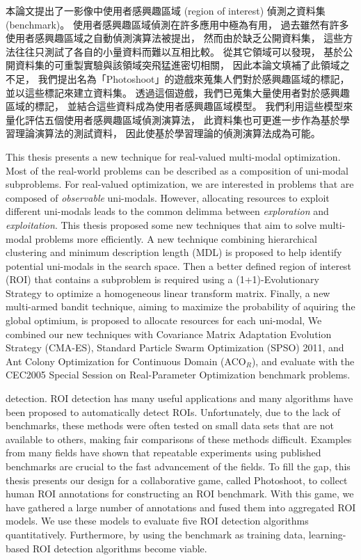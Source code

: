 \begin{abstractzh}
本論文提出了一影像中使用者感興趣區域 (region of interest)
偵測之資料集 (benchmark)。
使用者感興趣區域偵測在許多應用中極為有用，
過去雖然有許多使用者感興趣區域之自動偵測演算法被提出，
然而由於缺乏公開資料集，
這些方法往往只測試了各自的小量資料而難以互相比較。
從其它領域可以發現，
基於公開資料集的可重製實驗與該領域突飛猛進密切相關，
因此本論文填補了此領域之不足，
我們提出名為「Photoshoot」的遊戲來蒐集人們對於感興趣區域的標記，
並以這些標記來建立資料集。
透過這個遊戲，我們已蒐集大量使用者對於感興趣區域的標記，
並結合這些資料成為使用者感興趣區域模型。
我們利用這些模型來量化評估五個使用者感興趣區域偵測演算法，
此資料集也可更進一步作為基於學習理論演算法的測試資料，
因此使基於學習理論的偵測演算法成為可能。
\end{abstractzh}

\begin{abstracten}
This thesis presents a new technique for real-valued multi-modal optimization.
Most of the real-world problems can be described as a composition of uni-modal subproblems.
For real-valued optimization, we are interested in problems that are composed of \textit{observable} uni-modals.
However, allocating resources to exploit different uni-modals leads to the 
common delimma between \textit{exploration} and \textit{exploitation}.
This thesis proposed some new techniques that aim to solve multi-modal problems more efficiently.
A new technique combining hierarchical clustering and minimum description length (MDL) 
is proposed to help identify potential uni-modals in the search space.
Then a better defined region of interest (ROI) that contains a subproblem is required 
using a (1+1)-Evolutionary Strategy to optimize a homogeneous linear transform matrix.
Finally, a new multi-armed bandit technique, aiming to maximize the probability of aquiring the global optimium,
is proposed to allocate resources for each uni-modal,
We combined our new techniques with Covariance Matrix Adaptation Evolution Strategy (CMA-ES), 
Standard Particle Swarm Optimization (SPSO) 2011, and Ant Colony Optimization for Continuous Domain (ACO$_R$), 
and evaluate with the CEC2005 Special Session on Real-Parameter Optimization benchmark problems.




detection. ROI detection has many useful applications and many
algorithms have been proposed to automatically detect ROIs.  Unfortunately, due to the lack of benchmarks, these methods were often tested on small data sets that are not available to others,
making fair comparisons of these methods difficult. Examples from
many fields have shown that repeatable experiments using published
benchmarks are crucial to the fast advancement of the fields. To
fill the gap, this thesis presents our design for a collaborative
game, called Photoshoot, to collect human ROI annotations for
constructing an ROI benchmark. With this game, we have gathered a
large number of annotations and fused them into aggregated ROI
models. We use these models to evaluate five ROI detection
algorithms quantitatively. Furthermore, by using the benchmark as
training data, learning-based ROI detection algorithms become
viable.
\end{abstracten}

